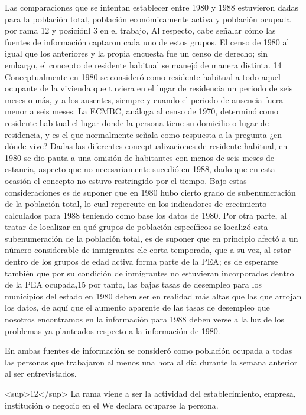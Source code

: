 \documentclass{article}
\begin{document}
Las comparaciones que se intentan establecer entre 1980 y 1988 estuvieron dadas para la población total, población económicamente activa y población ocupada por rama 12 y posiciónl 3 en el trabajo, Al respecto, cabe señalar cómo las fuentes de información captaron cada uno de estos grupos. El censo de 1980 al igual que los anteriores y la propia encuesta fue un censo de derecho; sin embargo, el concepto de residente habitual se manejó de manera distinta. 14 Conceptualmente en 1980 se consideró como residente habitual a todo aquel ocupante de la vivienda que tuviera en el lugar de residencia un periodo de seis meses o más, y a los ausentes, siempre y cuando el periodo de ausencia fuera menor a seis meses. La ECMBC, análoga al censo de 1970, determinó como residente habitual el lugar donde la persona tiene su domicilio o lugar de residencia, y es el que normalmente señala como respuesta a la pregunta ¿en dónde vive? Dadas las diferentes conceptualizaciones de residente habitual, en 1980 se dio pauta a una omisión de habitantes con menos de seis meses de estancia, aspecto que no necesariamente sucedió en 1988, dado que en esta ocasión el concepto no estuvo restringido por el tiempo. Bajo estas consideraciones es de suponer que en 1980 hubo cierto grado de subenumcración de la población total, lo cual repercute en los indicadores de crecimiento calculados para 1988 teniendo como base los datos de 1980. Por otra parte, al tratar de localizar en qué grupos de población específicos se localizó esta subenumeración de la población total, es de suponer que en principio afectó a un número considerable de inmigrantes ele corta temporada, que a su vez, al estar dentro de los grupos de edad activa forma parte de la PEA; es de esperarse también que por su condición de inmigrantes no estuvieran incorporados dentro de la PEA ocupada,15 por tanto, las bajas tasas de desempleo para los municipios del estado en 1980 deben ser en realidad más altas que las que arrojan los datos, de aquí que el aumento aparente de las tasas de desempleo que nosotros encontramos en la información para 1988 deben verse a la luz de los problemas ya planteados respecto a la información de 1980.

En ambas fuentes de información se consideró como población ocupada a todas las personas que trabajaron al menos una hora al día durante la semana anterior al ser entrevistados.

<sup>12</sup> La rama viene a ser la actividad del establecimiento, empresa, institución o negocio en el We declara ocuparse la persona.
\end{document}
